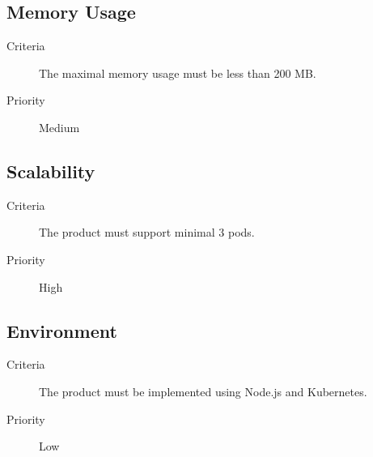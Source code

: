 \subsection{Memory Usage}
\begin{description}
\item[Criteria] The maximal memory usage must be less than 200 MB.
\item[Priority] Medium
\end{description}

\subsection{Scalability}
\begin{description}
\item[Criteria] The product must support minimal 3 pods.
\item[Priority] High
\end{description}

\subsection{Environment}
\begin{description}
\item[Criteria] The product must be implemented using Node.js and Kubernetes.
\item[Priority] Low
\end{description}